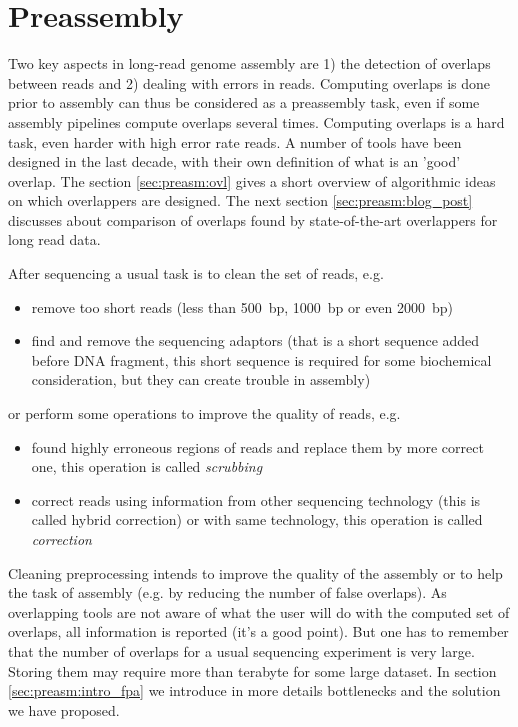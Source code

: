 \documentclass[main.tex]{subfiles}
\begin{document}
\chapter{Preassembly} \label{chapter:preassembly}

Two key aspects in long-read genome assembly are 1) the detection of overlaps between reads and 2) dealing with errors in reads. Computing overlaps is done prior to assembly can thus be considered as a preassembly task, even if some assembly pipelines compute overlaps several times. Computing overlaps is a hard task, even harder with high error rate reads. A number of tools have been designed in the last decade, with their own definition of what is an 'good' overlap. The section \ref{sec:preasm:ovl} gives a short overview of algorithmic ideas on which overlappers are designed. The next section \ref{sec:preasm:blog_post} discusses about comparison of overlaps found by state-of-the-art overlappers for long read data. 

\bigskip

After sequencing a usual task is to clean the set of reads, e.g.
\begin{itemize}
	\item remove too short reads (less than 500~bp, 1000~bp or even 2000~bp)
	\item find and remove the sequencing adaptors (that is a short sequence added before DNA fragment, this short sequence is required for some biochemical consideration, but they can create trouble in assembly)
\end{itemize}
or perform some operations to improve the quality of reads, e.g.
\begin{itemize}
	\item found highly erroneous regions of reads and replace them by more correct one, this operation is called \emph{scrubbing}
	\item correct reads using information from other sequencing technology (this is called hybrid correction) or with same technology, this operation is called \emph{correction} 
\end{itemize}
Cleaning preprocessing intends to improve the quality of the assembly or to help the task of assembly (e.g. by reducing the number of false overlaps). 
As overlapping tools are not aware of what the user will do with the computed set of overlaps, all information is reported (it's a good point). But one has to remember that the number of overlaps for a usual sequencing experiment is very large. Storing them may require more than terabyte for some large dataset. In section \ref{sec:preasm:intro_fpa} we introduce in more details bottlenecks and the solution we have proposed. 
\end{document}
